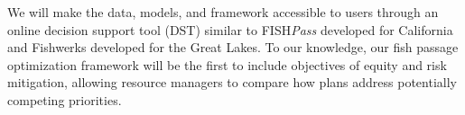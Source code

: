 


We will make the data, models, and framework accessible to users through an online decision support tool (DST) similar to FISH\emph{Pass} developed for California and Fishwerks developed for the Great Lakes. To our knowledge, our fish passage optimization framework will be the first to include objectives of equity and risk mitigation, allowing resource managers to compare how plans address potentially competing priorities. 


